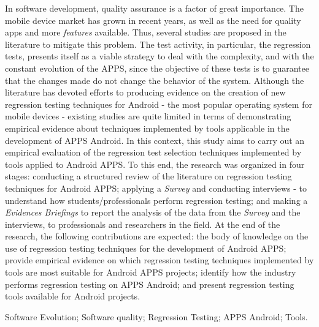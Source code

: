 


\abstract


In software development, quality assurance is a factor of great importance. The mobile device market has grown in recent years, as well as the need for quality apps and more \textit {features} available. Thus, several studies are proposed in the literature to mitigate this problem. The test activity, in particular, the regression tests, presents itself as a viable strategy to deal with the complexity, and with the constant evolution of the \ac {APPS}, since the objective of these tests is to guarantee that the changes made do not change the behavior of the system. Although the literature has devoted efforts to producing evidence on the creation of new regression testing techniques for Android - the most popular operating system for mobile devices - existing studies are quite limited in terms of demonstrating empirical evidence about techniques implemented by tools applicable in the development of \ac {APPS} Android. In this context, this study aims to carry out an empirical evaluation of the regression test selection techniques implemented by tools applied to Android \ac {APPS}. To this end, the research was organized in four stages: conducting a structured review of the literature on regression testing techniques for Android \ac {APPS}; applying a \textit {Survey} and conducting interviews - to understand how students/professionals perform regression testing; and making a \textit {Evidences Briefings} to report the analysis of the data from the \textit {Survey} and the interviews, to professionals and researchers in the field. At the end of the research, the following contributions are expected: the body of knowledge on the use of regression testing techniques for the development of Android \ac {APPS}; provide empirical evidence on which regression testing techniques implemented by tools are most suitable for Android \ac {APPS} projects; identify how the industry performs regression testing on \ac {APPS} Android; and present regression testing tools available for Android projects.


\begin{keywords}
Software Evolution; Software quality; Regression Testing; APPS Android; Tools.%
\end{keywords}